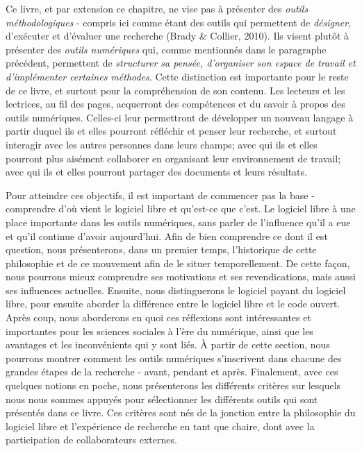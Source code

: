 \documentclass[
  letterpaper,
  DIV=11,
  numbers=noendperiod]{scrreprt}
\begin{document}
Ce livre, et par extension ce chapitre, ne vise pas à présenter des
\emph{outils méthodologiques} - compris ici comme étant des outils qui
permettent de \emph{désigner}, d'exécuter et d'évaluer une recherche
(Brady \& Collier, 2010). Ils visent plutôt à présenter des \emph{outils
numériques} qui, comme mentionnés dans le paragraphe précédent,
permettent de \emph{structurer sa pensée, d'organiser son espace de
travail et d'implémenter certaines méthodes}. Cette distinction est
importante pour le reste de ce livre, et surtout pour la compréhension
de son contenu. Les lecteurs et les lectrices, au fil des pages,
acquerront des compétences et du savoir à propos des outils numériques.
Celles-ci leur permettront de développer un nouveau langage à partir
duquel ils et elles pourront réfléchir et penser leur recherche, et
surtout interagir avec les autres personnes dans leurs champs; avec qui
ils et elles pourront plus aisément collaborer en organisant leur
environnement de travail; avec qui ils et elles pourront partager des
documents et leurs résultats.

Pour atteindre ces objectifs, il est important de commencer pas la base
- comprendre d'où vient le logiciel libre et qu'est-ce que c'est. Le
logiciel libre à une place importante dans les outils numériques, sans
parler de l'influence qu'il a eue et qu'il continue d'avoir aujourd'hui.
Afin de bien comprendre ce dont il est question, nous présenterons, dans
un premier temps, l'historique de cette philosophie et de ce mouvement
afin de le situer temporellement. De cette façon, nous pourrons mieux
comprendre ses motivations et ses revendications, mais aussi ses
influences actuelles. Ensuite, nous distinguerons le logiciel payant du
logiciel libre, pour ensuite aborder la différence entre le logiciel
libre et le code ouvert. Après coup, nous aborderons en quoi ces
réflexions sont intéressantes et importantes pour les sciences sociales
à l'ère du numérique, ainsi que les avantages et les inconvénients qui y
sont liés. À partir de cette section, nous pourrons montrer comment les
outils numériques s'inscrivent dans chacune des grandes étapes de la
recherche - avant, pendant et après. Finalement, avec ces quelques
notions en poche, nous présenterons les différents critères sur lesquels
nous nous sommes appuyés pour sélectionner les différents outils qui
sont présentés dans ce livre. Ces critères sont nés de la jonction entre
la philosophie du logiciel libre et l'expérience de recherche en tant
que chaire, dont avec la participation de collaborateurs externes.
\end{document}
